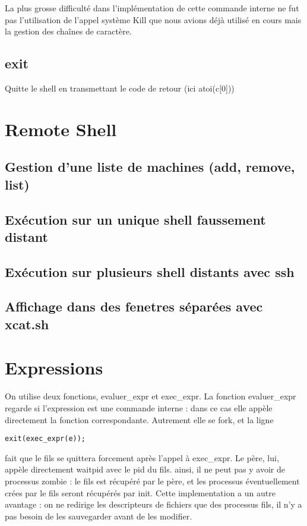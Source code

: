 \documentclass[12pt]{article}
\begin{document}
La plus grosse difficulté dans l'implémentation de cette commande interne ne fut pas l'utilisation de l'appel système Kill que nous avions déjà utilisé en cours mais la gestion des chaînes de caractère.

\subsection{exit}
Quitte le shell en transmettant le code de retour (ici atoi(c[0]))

\newpage
\section{Remote Shell}
\subsection{Gestion d'une liste de machines (add, remove, list)}

\subsection{Exécution sur un unique shell faussement distant}

\subsection{Exécution sur plusieurs shell distants avec ssh}

\subsection{Affichage dans des fenetres séparées avec xcat.sh}

\newpage
\section{Expressions}
On utilise deux fonctions, evaluer\_expr et exec\_expr.
La fonction evaluer\_expr regarde si l'expression est une commande interne : dans ce cas elle appèle directement
la fonction correspondante. Autrement elle se fork, et la ligne 
\begin{verbatim}
exit(exec_expr(e));
\end{verbatim}
fait que le fils se quittera forcement après l'appel à exec\_expr.
\newline Le père, lui, appèle directement waitpid avec le pid du fils.
ainsi, il ne peut pas y avoir de processus zombie : le fils est récupéré par le père,
et les processus éventuellement crées par le fils seront récupérés par init.\newline
Cette implementation a un autre avantage : on ne redirige les descripteurs de fichiers que des processus fils,
il n'y a pas besoin de les sauvegarder avant de les modifier.
\end{document}
